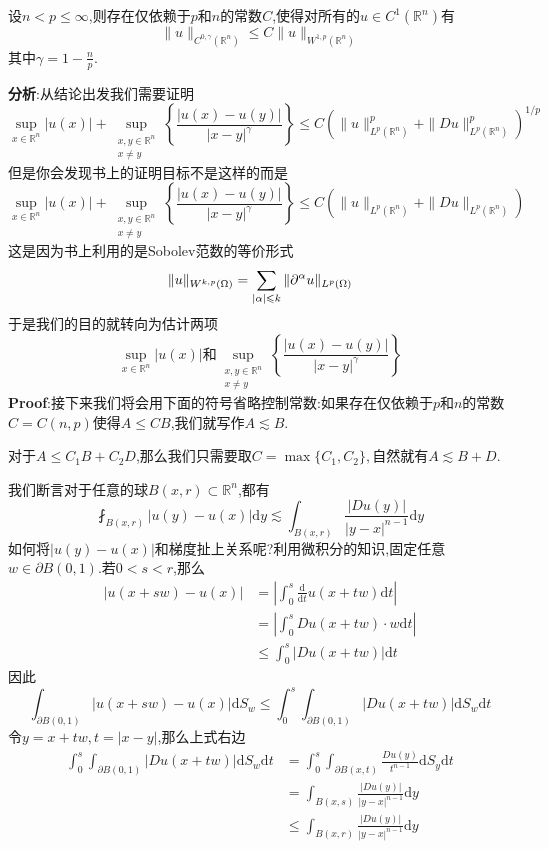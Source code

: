 \begin{tcolorbox}[colback=KuangNei,colframe=BianKuang,title=\textbf{Morrey不等式},sharpish corners]
   设$n<p\leqslant\infty$,则存在仅依赖于$p$和$n$的常数$C$,使得对所有的$u\in C^1(\mathbb{R}^n)$有
   $$
    \|u\|_{C^{0,\gamma}(\mathbb{R}^n)}\leqslant C\|u\|_{W^{1,p}(\mathbb{R}^n)}
   $$
   其中$\gamma=1-\frac{n}{p}$.
\end{tcolorbox}
\textbf{分析}:从结论出发我们需要证明
$$
\sup_{x\in\mathbb{R}^n}|u(x)|+\sup_{\substack{x,y\in\mathbb{R}^n\\x\neq y}}\left\{\frac{|u(x)-u(y)|}{|x-y|^{\gamma}}\right\}\leqslant C\left(\|u\|^p_{L^p(\mathbb{R}^n)}+\|Du\|^p_{L^p(\mathbb{R}^n)}\right)^{1/p}
$$
但是你会发现书上的证明目标不是这样的而是
$$
\sup_{x\in\mathbb{R}^n}|u(x)|+\sup_{\substack{x,y\in\mathbb{R}^n\\x\neq y}}\left\{\frac{|u(x)-u(y)|}{|x-y|^{\gamma}}\right\}\leqslant C\left(\|u\|_{L^p(\mathbb{R}^n)}+\|Du\|_{L^p(\mathbb{R}^n)}\right)
$$
这是因为书上利用的是Sobolev范数的等价形式
$$
\|u\|_{W^{k,p}(\Omega)}=\sum_{|\alpha|\leqslant k}\|\partial ^{\alpha}u\|_{L^{p}(\Omega)}
$$
于是我们的目的就转向为估计两项
$$
\sup_{x\in\mathbb{R}^n}|u(x)|\text{和}\sup_{\substack{x,y\in\mathbb{R}^n\\x\neq y}}\left\{\frac{|u(x)-u(y)|}{|x-y|^{\gamma}}\right\}
$$
\qquad \textbf{Proof}:接下来我们将会用下面的符号省略控制常数:如果存在仅依赖于$p$和$n$的常数$C=C(n,p)$使得$A\leqslant CB$,我们就写作$A\lesssim B$.\par
对于$A\leqslant C_1B+C_2D$,那么我们只需要取$C=\max\{C_1,C_2\},$自然就有$A\lesssim B+D$.\par
我们断言对于任意的球$B(x,r)\subset\mathbb{R}^n$,都有
$$
\fint_{B(x,r)}|u(y)-u(x)|\mathrm{d}y\lesssim\int_{B(x,r)}\frac{|Du(y)|}{|y-x|^{n-1}}\mathrm{d}y
$$
如何将$|u(y)-u(x)|$和梯度扯上关系呢?利用微积分的知识,固定任意$w\in\partial B(0,1)$.若$0<s<r$,那么
$$
\begin{aligned}
    |u(x+sw)-u(x)| &=\left|\int_0^s\frac{\mathrm{d}}{\mathrm{d}t}u(x+tw)\mathrm{d}t\right|\\
                   &=\left|\int_0^s Du(x+tw)\cdot w\mathrm{d}t\right|\\
                   &\leqslant \int_0^s|Du(x+tw)|\mathrm{d}t
\end{aligned}
$$
因此
$$
\int_{\partial B(0,1)}|u(x+sw)-u(x)|\mathrm{d}S_w\leqslant \int_0^s\int_{\partial B(0,1)}|Du(x+tw)|\mathrm{d}S_w\mathrm{d}t
$$
令$y=x+tw,t=|x-y|$,那么上式右边
$$
\begin{aligned}
    \int_0^s\int_{\partial B(0,1)}|Du(x+tw)|\mathrm{d}S_w\mathrm{d}t &= \int_0^s\int_{\partial B(x,t)}\frac{Du(y)}{t^{n-1}}\mathrm{d}S_y\mathrm{d}t \\
                                                                     &= \int_{B(x,s)}\frac{|Du(y)|}{|y-x|^{n-1}}\mathrm{d}y \\
                                                                     &\leqslant \int_{B(x,r)}\frac{|Du(y)|}{|y-x|^{n-1}}\mathrm{d}y 
\end{aligned}
$$

